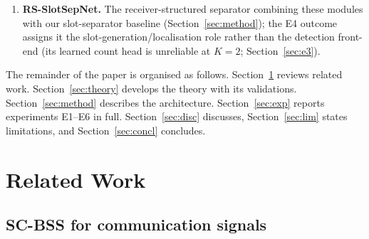 \documentclass[journal]{IEEEtran}
\begin{document}
\begin{enumerate}
        PSP/Viterbi: pooled SER $0.531$ vs.\ $0.534$) with no oracle
        carriers, phases or symbols during inference, winning beyond
        $5$\,dB --- robustly to separator strength: the same
        route built on a $26\times$ larger published separator (CNSE)
        reaches $0.444$ only through its oracle synchroniser (blind:
        $0.536$) and trails the joint loop at matched oracle
        frequencies ($0.411$ vs.\ $0.444$);
        E5 prices the envelope (blind
        modulation-pair selection and the tested $K{=}3$ acquisition
        fail, for measured reasons) and E6 sweeps the
        carrier-separation, timing and amplitude boundaries
        (Sections~\ref{sec:e3}--\ref{sec:e6}).
  \item \textbf{RS-SlotSepNet.} The receiver-structured separator
        combining these modules with our slot-separator baseline
        (Section~\ref{sec:method}); the
        E4 outcome assigns it the slot-generation/localisation role
        rather than the detection front-end (its learned count head is
        unreliable at $K{=}2$; Section~\ref{sec:e3}).
\end{enumerate}

The remainder of the paper is organised as follows.
Section~\ref{sec:related} reviews related work.
Section~\ref{sec:theory} develops the theory with its validations.
Section~\ref{sec:method} describes the architecture.
Section~\ref{sec:exp} reports experiments E1--E6 in full.
Section~\ref{sec:disc} discusses,
Section~\ref{sec:lim} states limitations, and Section~\ref{sec:concl}
concludes.

\section{Related Work}
\label{sec:related}

\subsection{SC-BSS for communication signals}
\end{document}
